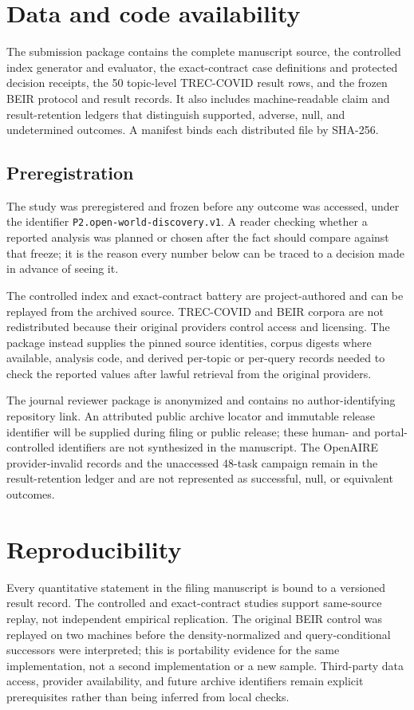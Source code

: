 \section{Data and code availability}
\label{sec:availability}

The submission package contains the complete manuscript source, the controlled
index generator and evaluator, the exact-contract case definitions and protected
decision receipts, the 50 topic-level TREC-COVID result rows, and the frozen
BEIR protocol and result records. It also includes machine-readable claim and
result-retention ledgers that distinguish supported, adverse, null, and
undetermined outcomes. A manifest binds each distributed file by SHA-256.

\subsection*{Preregistration}

The study was preregistered and frozen before any outcome was accessed, under
the identifier \texttt{P2.open-world-discovery.v1}.  A reader checking whether a
reported analysis was planned or chosen after the fact should compare against
that freeze; it is the reason every number below can be traced to a decision
made in advance of seeing it.

The controlled index and exact-contract battery are project-authored and can be
replayed from the archived source. TREC-COVID and BEIR corpora are not
redistributed because their original providers control access and licensing.
The package instead supplies the pinned source identities, corpus digests where
available, analysis code, and derived per-topic or per-query records needed to
check the reported values after lawful retrieval from the original providers.

The journal reviewer package is anonymized and contains no author-identifying
repository link. An attributed public archive locator and immutable release
identifier will be supplied during filing or public release; these human- and
portal-controlled identifiers are not synthesized in the manuscript. The
OpenAIRE provider-invalid records and the unaccessed 48-task campaign remain in
the result-retention ledger and are not represented as successful, null, or
equivalent outcomes.

\section{Reproducibility}

Every quantitative statement in the filing manuscript is bound to a versioned
result record. The controlled and exact-contract studies support same-source
replay, not independent empirical replication. The original BEIR control was
replayed on two machines before the density-normalized and query-conditional
successors were interpreted; this is portability evidence
for the same implementation, not a second implementation or a new sample.
Third-party data access, provider availability, and future archive identifiers
remain explicit prerequisites rather than being inferred from local checks.
